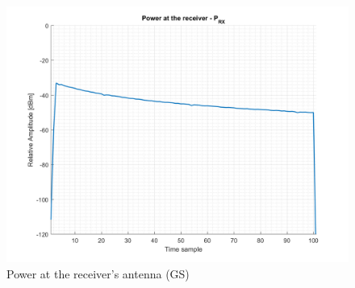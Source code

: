 \begin{figure}[H]
	\centering
	\includegraphics[scale=0.75]{figures/s2_power.png}
	\caption{Power at the receiver's antenna (GS)}
	\label{fig:s2_power}
\end{figure}

